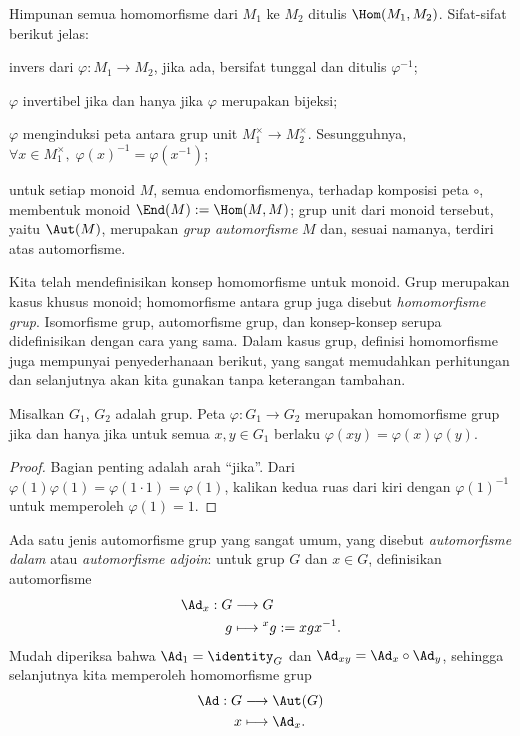 Himpunan semua homomorfisme dari $M_1$ ke $M_2$ ditulis $\Hom(M_1, M_2)$. Sifat-sifat berikut jelas:
\begin{compactitem}
	\item invers dari $\varphi: M_1 \to M_2$, jika ada, bersifat tunggal dan ditulis $\varphi^{-1}$;
	\item $\varphi$ invertibel jika dan hanya jika $\varphi$ merupakan bijeksi;
	\item $\varphi$ menginduksi peta antara grup unit $M_1^\times \to M_2^\times$. Sesungguhnya, $\forall x \in M_1^\times, \;\varphi(x)^{-1} = \varphi(x^{-1})$;
	\item untuk setiap monoid $M$, semua endomorfismenya, terhadap komposisi peta $\circ$, membentuk monoid $\End(M) := \Hom(M, M)$; grup unit dari monoid tersebut, yaitu $\Aut(M)$, merupakan \emph{grup automorfisme} $M$ dan, sesuai namanya, terdiri atas automorfisme.
\end{compactitem}

Kita telah mendefinisikan konsep homomorfisme untuk monoid. Grup merupakan kasus khusus monoid; homomorfisme antara grup juga disebut \emph{homomorfisme grup}. Isomorfisme grup, automorfisme grup, dan konsep-konsep serupa didefinisikan dengan cara yang sama. Dalam kasus grup, definisi homomorfisme juga mempunyai penyederhanaan berikut, yang sangat memudahkan perhitungan dan selanjutnya akan kita gunakan tanpa keterangan tambahan.
\begin{proposition}
	Misalkan $G_1$, $G_2$ adalah grup. Peta $\varphi: G_1 \to G_2$ merupakan homomorfisme grup jika dan hanya jika untuk semua $x, y \in G_1$ berlaku $\varphi(xy)=\varphi(x)\varphi(y)$.
\end{proposition}
\begin{proof}
	Bagian penting adalah arah ``jika''. Dari $\varphi(1)\varphi(1) = \varphi(1 \cdot 1) = \varphi(1)$, kalikan kedua ruas dari kiri dengan $\varphi(1)^{-1}$ untuk memperoleh $\varphi(1) = 1$.
\end{proof}

Ada satu jenis automorfisme grup yang sangat umum, yang disebut \emph{automorfisme dalam} atau \emph{automorfisme adjoin}: untuk grup $G$ dan $x \in G$, definisikan automorfisme
\begin{align*}
	\Ad_x: G & \longrightarrow G \\
	g & \longmapsto {}^x g := xgx^{-1}.
\end{align*}
Mudah diperiksa bahwa $\Ad_1 = \identity_G$ dan $\Ad_{xy} = \Ad_x \circ \Ad_y$, sehingga selanjutnya kita memperoleh homomorfisme grup
\begin{align*}
	\Ad: G & \longrightarrow \Aut(G) \\
	x & \longmapsto \Ad_x.
\end{align*}

